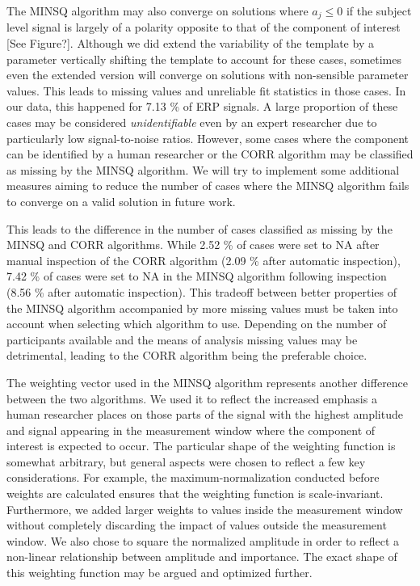 \documentclass[
  man]{apa7}
\begin{document}
The MINSQ algorithm may also converge on solutions where \(a_j \le 0\) if the subject level signal is largely of a polarity opposite to that of the component of interest {[}See Figure?{]}. Although we did extend the variability of the template by a parameter vertically shifting the template to account for these cases, sometimes even the extended version will converge on solutions with non-sensible parameter values. This leads to missing values and unreliable fit statistics in those cases. In our data, this happened for 7.13 \% of ERP signals. A large proportion of these cases may be considered \emph{unidentifiable} even by an expert researcher due to particularly low signal-to-noise ratios. However, some cases where the component can be identified by a human researcher or the CORR algorithm may be classified as missing by the MINSQ algorithm. We will try to implement some additional measures aiming to reduce the number of cases where the MINSQ algorithm fails to converge on a valid solution in future work.

This leads to the difference in the number of cases classified as missing by the MINSQ and CORR algorithms. While 2.52 \% of cases were set to NA after manual inspection of the CORR algorithm (2.09 \% after automatic inspection), 7.42 \% of cases were set to NA in the MINSQ algorithm following inspection (8.56 \% after automatic inspection). This tradeoff between better properties of the MINSQ algorithm accompanied by more missing values must be taken into account when selecting which algorithm to use. Depending on the number of participants available and the means of analysis missing values may be detrimental, leading to the CORR algorithm being the preferable choice.

The weighting vector used in the MINSQ algorithm represents another difference between the two algorithms. We used it to reflect the increased emphasis a human researcher places on those parts of the signal with the highest amplitude and signal appearing in the measurement window where the component of interest is expected to occur. The particular shape of the weighting function is somewhat arbitrary, but general aspects were chosen to reflect a few key considerations. For example, the maximum-normalization conducted before weights are calculated ensures that the weighting function is scale-invariant. Furthermore, we added larger weights to values inside the measurement window without completely discarding the impact of values outside the measurement window. We also chose to square the normalized amplitude in order to reflect a non-linear relationship between amplitude and importance. The exact shape of this weighting function may be argued and optimized further.
\end{document}
